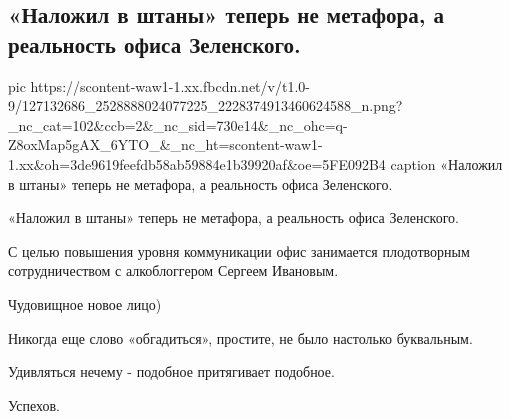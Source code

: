  
 
 
 
 
 
\subsection{«Наложил в штаны» теперь не метафора, а реальность офиса Зеленского.}
\label{sec:24_11_2020.fb.lukash_elena.1.nalozhil_v_shtany_zelja}

\ifcmt
pic https://scontent-waw1-1.xx.fbcdn.net/v/t1.0-9/127132686_2528888024077225_2228374913460624588_n.png?_nc_cat=102&ccb=2&_nc_sid=730e14&_nc_ohc=q-Z8oxMap5gAX_6YTO_&_nc_ht=scontent-waw1-1.xx&oh=3de9619feefdb58ab59884e1b39920af&oe=5FE092B4
caption «Наложил в штаны» теперь не метафора, а реальность офиса Зеленского.  
\fi

«Наложил в штаны» теперь не метафора, а реальность офиса Зеленского.  

С целью повышения уровня коммуникации офис занимается плодотворным
сотрудничеством с алкоблоггером Сергеем Ивановым. 

Чудовищное новое лицо) 

Никогда еще слово «обгадиться», простите, не было настолько буквальным. 

Удивляться нечему - подобное притягивает подобное. 

Успехов.
